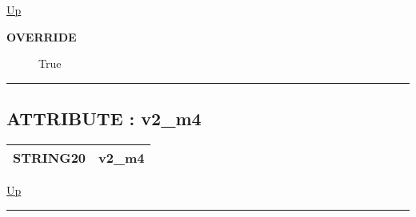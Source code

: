 \hyperlink{ecldoc:example_2.mod_4}{Up}

\par

\par
\begin{description}
\item [\textbf{OVERRIDE}] True
\end{description}

\rule{\textwidth}{0.4pt}
\subsection*{ATTRIBUTE : v2\_m4}
\hypertarget{ecldoc:example_2.mod_4.v2_m4}{}

{\renewcommand{\arraystretch}{1.5}
\begin{tabularx}{\textwidth}{|>{\raggedright\arraybackslash}l|X|}
\hline
\hspace{0pt}STRING20 & v2\_m4 \\
\hline
\end{tabularx}
}

\hyperlink{ecldoc:example_2.mod_4}{Up}

\par


\rule{\textwidth}{0.4pt}




